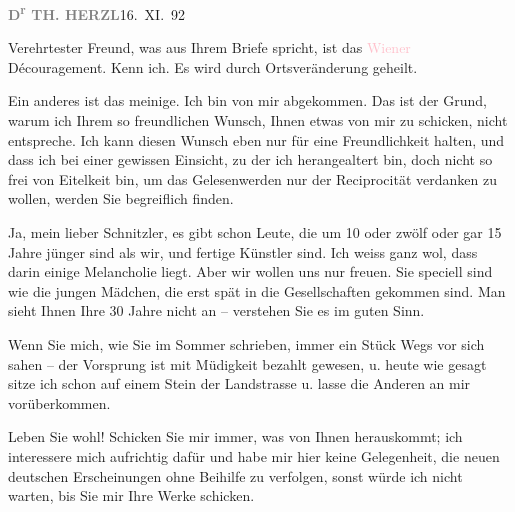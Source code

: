 \pstart
           \textcolor{gray}{\textbf{D\textsuperscript{r}{ }TH. HERZL}}\hfill 16. XI. 92\pend
           
\pstart{}Verehrtester Freund,\pend\vspace{0.5em}
\pstart
           was aus Ihrem Briefe spricht,
               ist das \textcolor{pink}{Wiener}\ledrightnote{\textcolor{pink}{Wien}} Découragement.
      Kenn ich. Es wird durch Ortsveränderung
      geheilt.\pend
           
\pstart
           Ein anderes ist das meinige.
      Ich bin von mir abgekommen.
      Das ist der Grund, warum ich
      Ihrem so freundlichen Wunsch,
      Ihnen etwas von mir zu schicken,
      nicht entspreche. Ich kann diesen
      Wunsch eben nur für eine
      Freundlichkeit halten, und dass
      ich bei einer gewissen Einsicht,
      zu der ich herangealtert bin,
      doch nicht so frei von Eitelkeit
      bin, um das Gelesenwerden nur
                  {\pb}der Reciprocität verdanken zu
      wollen, werden Sie begreiflich
      finden.\pend
           
\pstart
           Ja, mein lieber Schnitzler, es gibt
      schon Leute, die um 10 oder
      zwölf oder gar 15 Jahre jünger
      sind als wir, und fertige
      Künstler sind. Ich weiss ganz
      wol, dass darin einige Melancholie
      liegt. Aber wir wollen uns nur
      freuen. Sie speciell sind wie die
      jungen Mädchen, die erst spät
      in die Gesellschaften gekommen sind.
      Man sieht Ihnen Ihre 30 Jahre
      nicht an – verstehen Sie es im
      guten Sinn.\pend
           
\pstart
           Wenn Sie mich, wie Sie im Sommer
      schrieben, immer ein Stück Wegs
      vor sich sahen – der Vorsprung
      ist mit Müdigkeit bezahlt gewesen,
      u. heute wie gesagt sitze {\pb}ich schon auf einem Stein
      der Landstrasse u. lasse die
      Anderen an mir vorüberkommen.\pend
           
\pstart
           Leben Sie wohl! Schicken Sie
      mir immer, was von Ihnen
      herauskommt; ich interessere mich
      aufrichtig dafür und habe mir
      hier keine Gelegenheit, die neuen
      deutschen Erscheinungen  ohne
      Beihilfe zu verfolgen, sonst würde
      ich nicht warten, bis Sie mir
      Ihre Werke schicken.\pend
           
